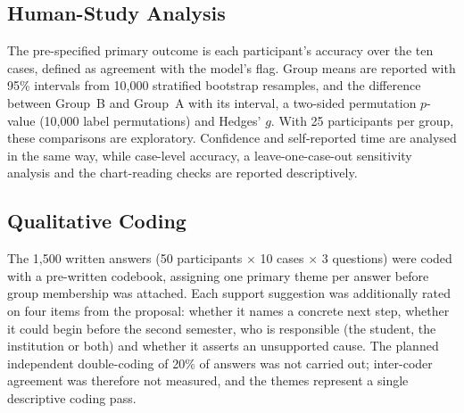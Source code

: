\subsection{Human-Study Analysis}

The pre-specified primary outcome is each participant's accuracy over the ten cases, defined as
agreement with the model's flag. Group means are reported with 95\% intervals from 10,000 stratified
bootstrap resamples, and the difference between Group~B and Group~A with its interval, a two-sided
permutation $p$-value (10,000 label permutations) and Hedges' $g$. With 25 participants per group,
these comparisons are exploratory. Confidence and self-reported time are analysed in the same way,
while case-level accuracy, a leave-one-case-out sensitivity analysis and the chart-reading checks
are reported descriptively.

\subsection{Qualitative Coding}

The 1,500 written answers (50 participants $\times$ 10 cases $\times$ 3 questions) were coded with a
pre-written codebook, assigning one primary theme per answer before group membership was attached.
Each support suggestion was additionally rated on four items from the proposal: whether it names a
concrete next step, whether it could begin before the second semester, who is responsible (the
student, the institution or both) and whether it asserts an unsupported cause. The planned
independent double-coding of 20\% of answers was not carried out; inter-coder agreement was
therefore not measured, and the themes represent a single descriptive coding pass.
